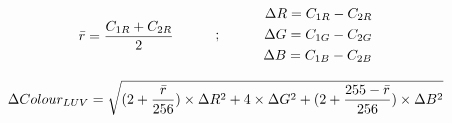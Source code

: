 \begin{equation}
\begin{split}
\label{eq:RedMeanRGBDiff}
\bar{r} = \frac{C_{1R} + C_{2R}}{2}
\end{split}
\quad\quad\quad ; \quad\quad\quad
 \begin{split}
\Delta R = C_{1R} - C_{2R}\\
\Delta G = C_{1G} - C_{2G}\\
\Delta B = C_{1B} - C_{2B}
 \end{split}
\end{equation}

\begin{equation}
\label{eq:DiffColorLUV}
\Delta Colour_{LUV} = \sqrt{(2 + \frac{\bar{r}}{256}) \times \Delta R^{2} + 4 \times \Delta G^{2} + (2 + \frac{255 - \bar{r}}{256}) \times \Delta B^{2} }
\end{equation}







